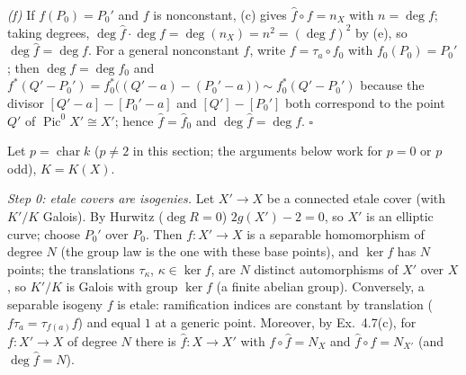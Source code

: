 \documentclass[11pt]{article}
\begin{document}
\emph{(f)} If $f(P_0)=P_0'$ and $f$ is nonconstant, (c) gives $\hat f\circ f=n_X$ with $n=\deg f$; taking degrees, $\deg\hat f\cdot\deg f=\deg(n_X)=n^2=(\deg f)^2$ by (e), so $\deg\hat f=\deg f$. For a general nonconstant $f$, write $f=\tau_a\circ f_0$ with $f_0(P_0)=P_0'$; then $\deg f=\deg f_0$ and $f^*(Q'-P_0')=f_0^*\bigl((Q'-a)-(P_0'-a)\bigr)\sim f_0^*(Q'-P_0')$ because the divisor $[Q'-a]-[P_0'-a]$ and $[Q']-[P_0']$ both correspond to the point $Q'$ of $\operatorname{Pic}^0X'\cong X'$; hence $\hat f=\hat f_0$ and $\deg\hat f=\deg f$. \hfill$\square$

\pf
Let $p=\operatorname{char}k$ ($p\ne2$ in this section; the arguments below work for $p=0$ or $p$ odd), $K=K(X)$.

\emph{Step 0: etale covers are isogenies.} Let $X'\to X$ be a connected etale cover (with $K'/K$ Galois). By Hurwitz ($\deg R=0$) $2g(X')-2=0$, so $X'$ is an elliptic curve; choose $P_0'$ over $P_0$. Then $f:X'\to X$ is a separable homomorphism of degree $N$ (the group law is the one with these base points), and $\ker f$ has $N$ points; the translations $\tau_\kappa$, $\kappa\in\ker f$, are $N$ distinct automorphisms of $X'$ over $X$, so $K'/K$ is Galois with group $\ker f$ (a finite abelian group). Conversely, a separable isogeny $f$ is etale: ramification indices are constant by translation ($f\tau_a=\tau_{f(a)}f$) and equal $1$ at a generic point. Moreover, by Ex.~4.7(c), for $f:X'\to X$ of degree $N$ there is $\hat f:X\to X'$ with $f\circ\hat f=N_X$ and $\hat f\circ f=N_{X'}$ (and $\deg \hat f=N$).
\end{document}
